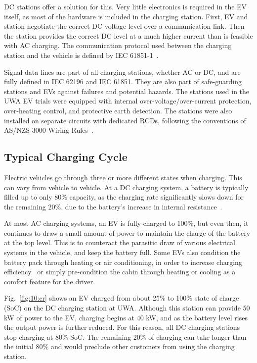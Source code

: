 DC stations offer a solution for this. Very little electronics is required in the EV itself, as most of the hardware is included in the charging station. First, EV and station negotiate the correct DC voltage level over a communication link. Then the station provides the correct DC level at a much higher current than is feasible with AC charging. The communication protocol used between the charging station and the vehicle is defined by IEC 61851-1~\cite{international_electrotechnical_commission_iec_2017}.

Signal data lines are part of all charging stations, whether AC or DC, and are fully defined in IEC 62196 and IEC 61851. They are also part of safe-guarding stations and EVs against failures and potential hazards. The stations used in the UWA EV trials were equipped with internal over-voltage/over-current protection, over-heating control, and protective earth detection. The stations were also installed on separate circuits with dedicated RCDs, following the conventions of AS/NZS 3000 Wiring Rules~\cite{standards_association_of_australia_electrical_2018}.

\subsection{Typical Charging Cycle}
Electric vehicles go through three or more different states when charging. This can vary from vehicle to vehicle. At a DC charging system, a battery is typically filled up to only 80\% capacity, as the charging rate significantly slows down for the remaining 20\%, due to the battery’s increase in internal resistance~\cite{tritium_pty_ltd_veefil--electric_2015}.

At most AC charging systems, an EV is fully charged to 100\%, but even then, it continues to draw a small amount of power to maintain the charge of the battery at the top level. This is to counteract the parasitic draw of various electrical systems in the vehicle, and keep the battery full. Some EVs also condition the battery pack through heating or air conditioning, in order to increase charging efficiency~\cite{wang_critical_2016, bullis_electric_2013} or simply pre-condition the cabin through heating or cooling as a comfort feature for the driver. 

Fig.~\ref{fig:10:cr} shows an EV charged from about 25\% to 100\% state of charge (SoC) on the DC charging station at UWA. Although this station can provide 50 kW of power to the EV, charging begins at 40 kW, and as the battery level rises the output power is further reduced. For this reason, all DC charging stations stop charging at 80\% SoC. The remaining 20\% of charging can take longer than the initial 80\% and would preclude other customers from using the charging station.

